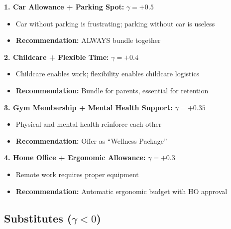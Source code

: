 \begin{tcolorbox}[colback=green!5!white,colframe=green!75!black,title=\textbf{Benefit Bundles to Combine}]

\textbf{1. Car Allowance + Parking Spot:} $\gamma = +0.5$
\begin{itemize}[noitemsep]
    \item Car without parking is frustrating; parking without car is useless
    \item \textbf{Recommendation:} ALWAYS bundle together
\end{itemize}

\textbf{2. Childcare + Flexible Time:} $\gamma = +0.4$
\begin{itemize}[noitemsep]
    \item Childcare enables work; flexibility enables childcare logistics
    \item \textbf{Recommendation:} Bundle for parents, essential for retention
\end{itemize}

\textbf{3. Gym Membership + Mental Health Support:} $\gamma = +0.35$
\begin{itemize}[noitemsep]
    \item Physical and mental health reinforce each other
    \item \textbf{Recommendation:} Offer as ``Wellness Package''
\end{itemize}

\textbf{4. Home Office + Ergonomic Allowance:} $\gamma = +0.3$
\begin{itemize}[noitemsep]
    \item Remote work requires proper equipment
    \item \textbf{Recommendation:} Automatic ergonomic budget with HO approval
\end{itemize}

\end{tcolorbox}

\subsection{Substitutes ($\gamma < 0$)}
\label{subsec:substitutes}


